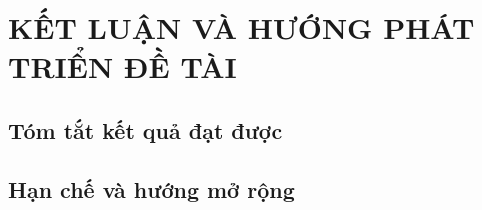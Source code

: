 \chapter{KẾT LUẬN VÀ HƯỚNG PHÁT TRIỂN ĐỀ TÀI}
\section{Tóm tắt kết quả đạt được}

\section{Hạn chế và hướng mở rộng}

